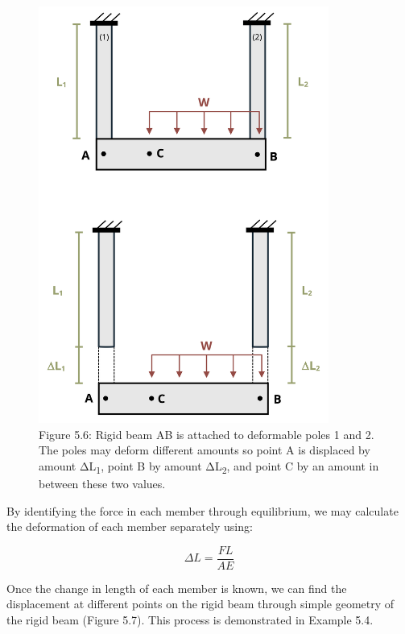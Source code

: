 \documentclass[
  letterpaper,
  DIV=11,
  numbers=noendperiod]{scrreprt}
\begin{document}
\begin{figure}[H]

{\centering \includegraphics[width=3.75in,height=\textheight]{images/PNGs/Figure 5.7.png}

}

\caption{Figure 5.6: Rigid beam AB is attached to deformable poles 1 and
2. The poles may deform different amounts so point A is displaced by
amount ΔL\textsubscript{1}, point B by amount ΔL\textsubscript{2}, and
point C by an amount in between these two values.}

\end{figure}%

By identifying the force in each member through equilibrium, we may
calculate the deformation of each member separately using:

\[
\Delta L=\frac{F L}{A E}\]

Once the change in length of each member is known, we can find the
displacement at different points on the rigid beam through simple
geometry of the rigid beam (Figure 5.7). This process is demonstrated in
Example 5.4.
\end{document}
